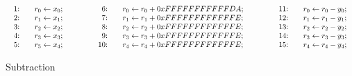 \begin{figure*}[ht]
  \centering
  $
  \begin{array}{lclcl}
    \begin{array}{rcl}
    \textmd{1:} && {r}_0 \leftarrow {x}_0; \\
    \textmd{2:} && {r}_1 \leftarrow {x}_1; \\
    \textmd{3:} && {r}_2 \leftarrow {x}_2; \\
    \textmd{4:} && {r}_3 \leftarrow {x}_3; \\
    \textmd{5:} && {r}_5 \leftarrow {x}_4; \\
    \end{array}
    &\hspace{.05\textwidth}&
    \begin{array}{rcl}
    \textmd{6:} &&
      {r}_0 \leftarrow {r}_0 + {0xFFFFFFFFFFFDA}; \\
    \textmd{7:} &&
      {r}_1 \leftarrow {r}_1 + {0xFFFFFFFFFFFFE}; \\
    \textmd{8:} &&
      {r}_2 \leftarrow {r}_2 + {0xFFFFFFFFFFFFE}; \\
    \textmd{9:} &&
      {r}_3 \leftarrow {r}_3 + {0xFFFFFFFFFFFFE}; \\
    \textmd{10:} &&
      {r}_4 \leftarrow {r}_4 + {0xFFFFFFFFFFFFE}; \\
    \end{array}
    &\hspace{.05\textwidth}&
    \begin{array}{rcl}
    \textmd{11:} && {r}_0 \leftarrow {r}_0 - {y}_0; \\
    \textmd{12:} && {r}_1 \leftarrow {r}_1 - {y}_1; \\
    \textmd{13:} && {r}_2 \leftarrow {r}_2 - {y}_2; \\
    \textmd{14:} && {r}_3 \leftarrow {r}_3 - {y}_3; \\
    \textmd{15:} && {r}_4 \leftarrow {r}_4 - {y}_4;
    \end{array}
  \end{array}
  $
  \caption{Subtraction }
  \label{figure:dsl:subtraction}
\end{figure*}

